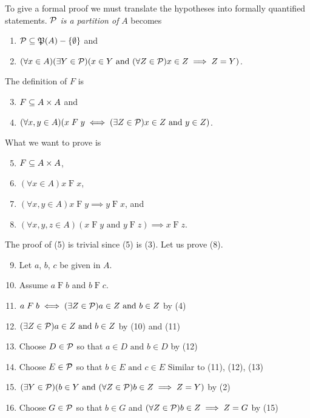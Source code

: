\documentclass{report}
\renewcommand*{\land}{\text{ and }}
\begin{document}
\begin{solution}
To give a formal proof we must translate the hypotheses into formally quantified statements.
$\mathcal{P}$ \textit{is a partition of} $A$ becomes
\begin{enumerate}[label=(\arabic*)]
    \item $\mathcal{P}\subseteq \operatorname{\mathfrak{P}}(A)-\left\{\emptyset\right\}$ and
    \item $(\forall x\in A)(\exists Y\in\mc P)(x\in Y\land (\forall Z\in\mc P)x\in Z\implies Z=Y)$.
\end{enumerate}
The definition of $F$ is
\begin{enumerate}[label=(\arabic*)]
    \setcounter{enumi}{2}
    \item $F\subseteq A\times A$ and
    \item $(\forall x,y\in A)(x\mathrel{F}y \iff (\exists Z\in\mc P)x\in Z\land y\in Z)$.
\end{enumerate}
What we want to prove is
\begin{enumerate}[label=(\arabic*)]
    \setcounter{enumi}{4}
    \item $F\subseteq A\times A$,
    \item $(\forall x\in A)x\mathrel F x$,
    \item $(\forall x, y\in A)x\mathrel F y \implies y \mathrel F x$, and
    \item $(\forall x,y,z\in A)(x\mathrel F y\land y\mathrel F z)\implies x\mathrel F z$.
\end{enumerate}
The proof of (5) is trivial since (5) is (3). Let us prove (8).
\begin{enumerate}[label=(\arabic*)]
    \setcounter{enumi}{8}
    \item Let $a$, $b$, $c$ be given in $A$.
    \item \quad Assume $a\mathrel F b$ and $b\mathrel F c$.
    \item \quad\quad $a\mathrel F b\iff (\exists Z\in\mc P)a\in Z\land b\in Z$ \hfill by (4)
    \item \quad\quad $(\exists Z\in\mc P)a\in Z\land b\in Z$ \hfill by (10) and (11)
    \item \quad\quad Choose $D\in\mathcal{P}$ so that $a\in D\land b\in D$ \hfill by (12)
    \item \quad\quad Choose $E\in\mathcal{P}$ so that $b\in E\land c\in E$ \hfill Similar to (11), (12), (13)
    \item \quad\quad $(\exists Y\in\mc P)(b\in Y\land (\forall Z\in\mc P)b\in Z\implies Z=Y)$ \hfill by (2)
    \item \quad\quad Choose $G\in\mathcal{P}$ so that $b\in G$ and $(\forall Z\in\mathcal{P})b\in Z\implies Z=G$ \hfill by (15)

\end{enumerate}
\end{solution}
\end{document}
